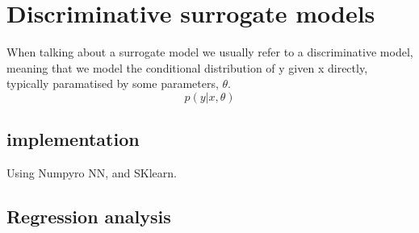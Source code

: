 \chapter{Discriminative surrogate models}
When talking about a surrogate model we usually refer to a discriminative model, meaning
that we model the conditional distribution of y given x directly, typically paramatised by some parameters, $\theta$. 
$$p(y|x, \theta)$$




\section{implementation}
Using Numpyro NN,
and SKlearn. 


\section{Regression analysis}

